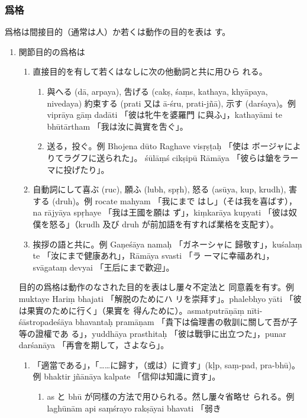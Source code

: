 \subsubsection{爲格}
\numberParagraph
爲格は間接目的（通常は人）か若くは動作の目的を表は
す。
\begin{enumerate}[label=(\Alph*)]
\item 関節目的の爲格は
\begin{enumerate}[label=(\arabic*)]
\item 直接目的を有して若くはなしに次の他動詞と共に用ひら
れる。
\begin{enumerate}[label=(\alph*)]
\item 與へる (dā, arpaya), 吿げる (cakṣ, śaṃs, kathaya,
khyāpaya, nivedaya) 約束する (prati 又は ā-śru, prati-jñā),
示す (darśaya)。例 viprāya gāṃ dadāti 「彼は牝牛を婆羅門
に與ふ」，kathayāmi te bhūtārtham 「我は汝に眞實を吿ぐ」。
\item 送る，投ぐ。例 Bhojena dūto Raghave visṛṣṭaḥ 「使は
ボージャによりてラグフに送られた」。 śūlāṃś cikṣipū Rāmāya
「彼らは鎗をラーマに投げたり」。
\end{enumerate}
\item 自動詞にして喜ぶ (ruc), 願ふ (lubh, spṛh), 怒る (asūya,
kup, krudh), 害する (druh)。例 rocate mahyam 「我にまで
はし」（そは我を喜ばす），na rājyāya spṛhaye 「我は王國を願は
ず」，kiṃkarāya kupyati 「彼は奴僕を怒る」（krudh 及び druh
が前加語を有すれば業格を支配す）。
\item 挨拶の語と共に。例 Gaṇeśāya namaḥ 「ガネーシャに
歸敬す」，kuśalaṃ te 「汝にまで健康あれ」，Rāmāya svasti 「ラ
ーマに幸福あれ」，svāgataṃ devyai 「王后にまで歡迎」。
\end{enumerate}
目的の爲格は動作のなされた目的を表はし屢々不定法と
同意義を有す。例 muktaye Hariṃ bhajati 「解脱のためにハ
リを崇拜す」。phalebhyo yāti 「彼は果實のために行く」（果實を
得んために）。asmatputrāṇāṃ nīti-śāstropadeśāya bhavantaḥ
pramāṇam 「貴下は倫理書の敎訓に關して吾が子等の證權であ
る」，yuddhāya prasthitaḥ 「彼は戰爭に出立つた」，punar
darśanāya 「再會を期して，さよなら」。
\begin{enumerate}[label=(\arabic*)]
\item 「適當である」，「……に歸す，（或は）に資す」(kḷp, saṃ-pad,
pra-bhū)。例 bhaktir jñānāya kalpate 「信仰は知識に資す」。
\begin{enumerate}[label=(\alph*)]
\item as と bhū が同樣の方法で用ひられる。然し屢々省略せ
られる。例 laghūnām api saṃśrayo rakṣāyai bhavati 「弱き

\end{enumerate}
\end{enumerate}
\end{enumerate}

